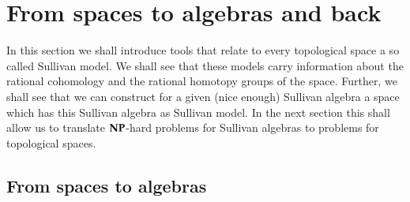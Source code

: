 
 \section{From spaces to algebras and back} 
 In this section we shall introduce tools that relate to every topological space a so called Sullivan model. We shall see
 that these models carry information about the rational cohomology  and the rational homotopy
 groups of the space. Further, we shall see that we can construct for a given (nice enough) Sullivan algebra a space which
 has this Sullivan algebra as Sullivan model. In the next section this shall allow us to translate $\mathbf{NP}$-hard
 problems for Sullivan algebras to problems for topological spaces.
 \subsection{From spaces to algebras}\label{sec:FromSpacesToAlgebras}
 
